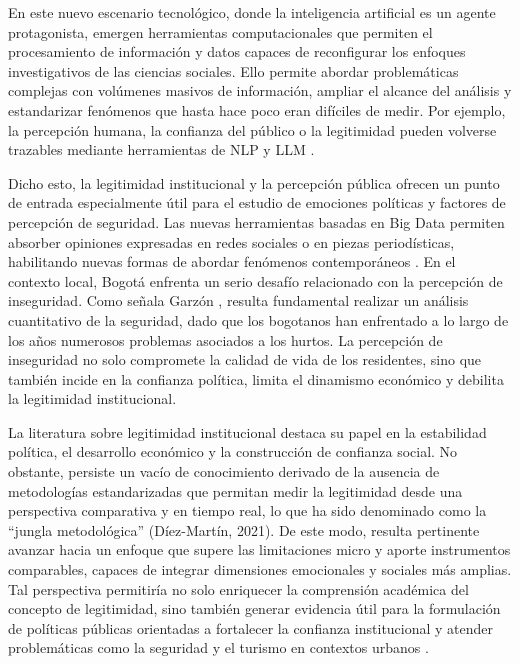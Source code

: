\documentclass[sn-basic,pdflatex]{sn-jnl}
\theoremstyle{remark}
\theoremstyle{definition}
\begin{document}
En este nuevo escenario tecnológico, donde la inteligencia artificial es
un agente protagonista, emergen herramientas computacionales que
permiten el procesamiento de información y datos capaces de reconfigurar
los enfoques investigativos de las ciencias sociales. Ello permite
abordar problemáticas complejas con volúmenes masivos de información,
ampliar el alcance del análisis y estandarizar fenómenos que hasta hace
poco eran difíciles de medir. Por ejemplo, la percepción humana, la
confianza del público o la legitimidad pueden volverse trazables
mediante herramientas de NLP y LLM \citep{tindall2011}.

Dicho esto, la legitimidad institucional y la percepción pública ofrecen
un punto de entrada especialmente útil para el estudio de emociones
políticas y factores de percepción de seguridad. Las nuevas herramientas
basadas en Big Data permiten absorber opiniones expresadas en redes
sociales o en piezas periodísticas, habilitando nuevas formas de abordar
fenómenos contemporáneos \citep{etter2016}. En el contexto local, Bogotá
enfrenta un serio desafío relacionado con la percepción de inseguridad.
Como señala Garzón \citep{garzon2019}, resulta fundamental realizar un
análisis cuantitativo de la seguridad, dado que los bogotanos han
enfrentado a lo largo de los años numerosos problemas asociados a los
hurtos. La percepción de inseguridad no solo compromete la calidad de
vida de los residentes, sino que también incide en la confianza
política, limita el dinamismo económico y debilita la legitimidad
institucional.

La literatura sobre legitimidad institucional destaca su papel en la
estabilidad política, el desarrollo económico y la construcción de
confianza social. No obstante, persiste un vacío de conocimiento
derivado de la ausencia de metodologías estandarizadas que permitan
medir la legitimidad desde una perspectiva comparativa y en tiempo real,
lo que ha sido denominado como la ``jungla metodológica'' (Díez-Martín,
2021). De este modo, resulta pertinente avanzar hacia un enfoque que
supere las limitaciones micro y aporte instrumentos comparables, capaces
de integrar dimensiones emocionales y sociales más amplias. Tal
perspectiva permitiría no solo enriquecer la comprensión académica del
concepto de legitimidad, sino también generar evidencia útil para la
formulación de políticas públicas orientadas a fortalecer la confianza
institucional y atender problemáticas como la seguridad y el turismo en
contextos urbanos \citep{lopezbalboa2021}.
\end{document}
